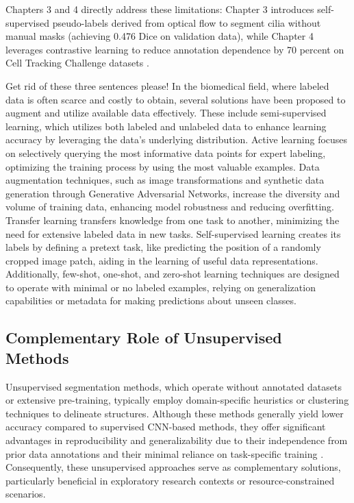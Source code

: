 \documentclass[./dissertation.tex]{subfiles}
\begin{document}
\textcolor{BulldogRed}{Chapters 3 and 4 directly address these limitations: Chapter 3 introduces self-supervised pseudo-labels derived from optical flow to segment cilia without manual masks (achieving 0.476 Dice on validation data), while Chapter 4 leverages contrastive learning to reduce annotation dependence by 70 percent on Cell Tracking Challenge datasets \cite{mavska2023cell}.}

\textcolor{Hedges}{Get rid of these three sentences please!} In the biomedical field, where labeled data is often scarce and costly to obtain, several solutions have been proposed to augment and utilize available data effectively. These include semi-supervised learning, which utilizes both labeled and unlabeled data to enhance learning accuracy by leveraging the data’s underlying distribution. Active learning focuses on selectively querying the most informative data points for expert labeling, optimizing the training process by using the most valuable examples. Data augmentation techniques, such as image transformations and synthetic data generation through Generative Adversarial Networks, increase the diversity and volume of training data, enhancing model robustness and reducing overfitting. Transfer learning transfers knowledge from one task to another, minimizing the need for extensive labeled data in new tasks. Self-supervised learning creates its labels by defining a pretext task, like predicting the position of a randomly cropped image patch, aiding in the learning of useful data representations. Additionally, few-shot, one-shot, and zero-shot learning techniques are designed to operate with minimal or no labeled examples, relying on generalization capabilities or metadata for making predictions about unseen classes.

\textcolor{BulldogRed}{\subsection{Complementary Role of Unsupervised Methods}}
\textcolor{BulldogRed}{Unsupervised segmentation methods, which operate without annotated datasets or extensive pre-training, typically employ domain-specific heuristics or clustering techniques to delineate structures. Although these methods generally yield lower accuracy compared to supervised CNN-based methods, they offer significant advantages in reproducibility and generalizability due to their independence from prior data annotations and their minimal reliance on task-specific training \cite{ji2019invariant}. Consequently, these unsupervised approaches serve as complementary solutions, particularly beneficial in exploratory research contexts or resource-constrained scenarios.}
\end{document}
